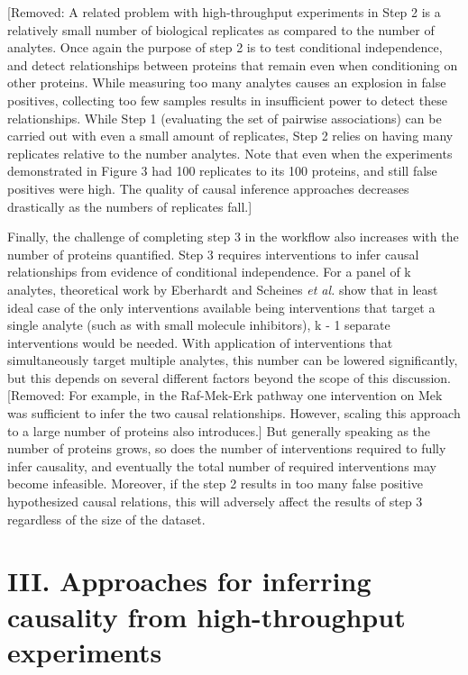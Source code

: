 \documentclass[journal=jacsat,manuscript=article]{achemso}
\def\added#1{{\color{blue} #1}}
\def\removed#1{{\color{magenta}[Removed: #1]}}
\begin{document}
\removed{A related problem with high-throughput experiments in Step 2 is a relatively small number of biological replicates as compared to the number of analytes.  Once again the purpose of step 2 is to test conditional independence, and detect relationships between proteins that remain even when conditioning on other proteins.  While measuring too many analytes causes an explosion in false positives, collecting too few samples results in insufficient power to detect these relationships. While Step 1 (evaluating the set of pairwise associations) can be carried out with even a small amount of replicates, Step 2 relies on having many replicates relative to the number analytes.  Note that even when the experiments demonstrated in Figure 3 had 100 replicates to its 100 proteins, and still false positives were high. The quality of causal inference approaches decreases drastically as the numbers of replicates fall.}

\added{Finally, the challenge of completing step 3 in the workflow also increases with the number of proteins quantified.}  Step 3 requires interventions to infer causal relationships from evidence of conditional independence.  \added{For a panel of k analytes, theoretical work by Eberhardt and Scheines {\it et al.} \cite{eberhardt2012number} show that in least ideal case of the only interventions available being interventions that target a single analyte (such as with small molecule inhibitors), k - 1 separate interventions would be needed.  With application of interventions that simultaneously target multiple analytes, this number can be lowered significantly, but this depends on several different factors\cite{eberhardt2012number,hauser2012two,hyttinen2013experiment} beyond the scope of this discussion.} \removed{For example, in the Raf-Mek-Erk pathway one intervention on Mek was sufficient to infer the two causal relationships. However, scaling this approach to a large number of proteins also introduces.}  But generally speaking as the number of proteins grows, so does the number of interventions required to fully infer causality, and eventually the total number of required interventions may become infeasible. Moreover, if the step 2 results in too many false positive hypothesized causal relations, this will adversely affect the results of step 3 regardless of the size of the dataset.


\section{III. Approaches for inferring causality from high-throughput experiments}
\end{document}
